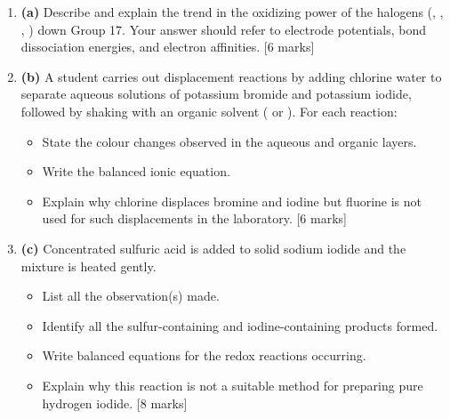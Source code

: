 \documentclass[11pt]{article}
\begin{document}
\begin{exercice}
\begin{enumerate}
\item \textbf{(a)} Describe and explain the trend in the oxidizing power of the halogens (, , , ) down Group 17. Your answer should refer to electrode potentials, bond dissociation energies, and electron affinities. \hfill [6 marks]
\item \textbf{(b)} A student carries out displacement reactions by adding chlorine water to separate aqueous solutions of potassium bromide and potassium iodide, followed by shaking with an organic solvent ( or ). For each reaction:
      \begin{itemize}
      \item State the colour changes observed in the aqueous and organic layers.
      \item Write the balanced ionic equation.
      \item Explain why chlorine displaces bromine and iodine but fluorine is not used for such displacements in the laboratory. \hfill [6 marks]
      \end{itemize}
\item \textbf{(c)} Concentrated sulfuric acid is added to solid sodium iodide and the mixture is heated gently.
      \begin{itemize}
      \item List all the observation(s) made.
      \item Identify all the sulfur-containing and iodine-containing products formed.
      \item Write balanced equations for the redox reactions occurring.
      \item Explain why this reaction is not a suitable method for preparing pure hydrogen iodide. \hfill [8 marks]
      \end{itemize}
\end{enumerate}
\end{exercice}
\end{document}
